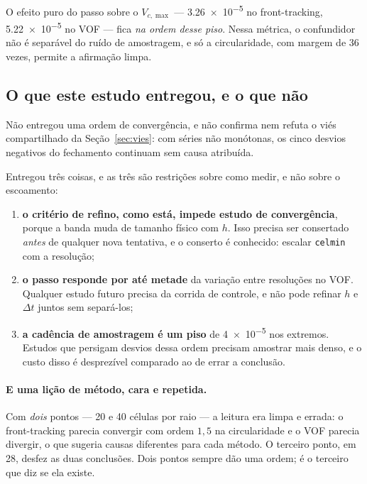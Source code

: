 O efeito puro do passo sobre o $V_{c,\max}$ --- \num{3.26e-5} no front-tracking,
\num{5.22e-5} no VOF --- fica \emph{na ordem desse piso}. Nessa m\'etrica, o
confundidor n\~ao \'e separ\'avel do ru\'ido de amostragem, e s\'o a
circularidade, com margem de 36 vezes, permite a afirma\c{c}\~ao limpa.

\subsection{O que este estudo entregou, e o que n\~ao}

N\~ao entregou uma ordem de converg\^encia, e n\~ao confirma nem refuta o vi\'es
compartilhado da Se\c{c}\~ao~\ref{sec:vies}: com s\'eries n\~ao mon\'otonas, os
cinco desvios negativos do fechamento continuam sem causa atribu\'ida.

Entregou tr\^es coisas, e as tr\^es s\~ao restri\c{c}\~oes sobre como medir, e
n\~ao sobre o escoamento:

\begin{enumerate}
  \item \textbf{o crit\'erio de refino, como est\'a, impede estudo de
    converg\^encia}, porque a banda muda de tamanho f\'isico com $h$. Isso
    precisa ser consertado \emph{antes} de qualquer nova tentativa, e o conserto
    \'e conhecido: escalar \texttt{celmin} com a resolu\c{c}\~ao;
  \item \textbf{o passo responde por at\'e metade} da varia\c{c}\~ao entre
    resolu\c{c}\~oes no VOF. Qualquer estudo futuro precisa da corrida de
    controle, e n\~ao pode refinar $h$ e $\Delta t$ juntos sem separ\'a-los;
  \item \textbf{a cadência de amostragem \'e um piso} de \num{4e-5} nos extremos.
    Estudos que persigam desvios dessa ordem precisam amostrar mais denso, e o
    custo disso \'e desprez\'ivel comparado ao de errar a conclus\~ao.
\end{enumerate}

\paragraph{E uma li\c{c}\~ao de m\'etodo, cara e repetida.} Com \emph{dois} pontos
--- 20 e 40 c\'elulas por raio --- a leitura era limpa e errada: o front-tracking
parecia convergir com ordem $1{,}5$ na circularidade e o VOF parecia divergir, o
que sugeria causas diferentes para cada m\'etodo. O terceiro ponto, em 28, desfez
as duas conclus\~oes. Dois pontos sempre d\~ao uma ordem; \'e o terceiro que diz
se ela existe.

